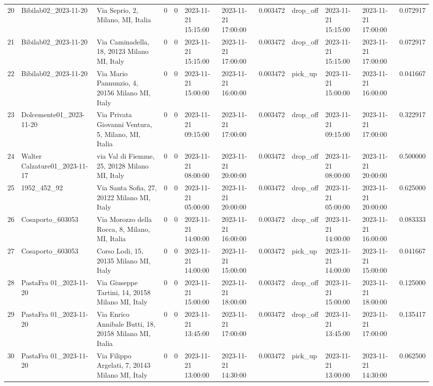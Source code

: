 \documentclass[titlepage]{article}
\begin{document}
\begin{table}[H]
\begin{adjustbox}{max width=\textwidth}
\begin{tabular}{rllrrllrlllr}
20 & Bibilab02\_2023-11-20 & Via Seprio, 2, Milano, MI, Italia & 0 & 0 & 2023-11-21 15:15:00 & 2023-11-21 17:00:00 & 0.003472 & drop\_off & 2023-11-21 15:15:00 & 2023-11-21 17:00:00 & 0.072917 \\
21 & Bibilab02\_2023-11-20 & Via Caminadella, 18, 20123 Milano MI, Italy & 0 & 0 & 2023-11-21 15:15:00 & 2023-11-21 17:00:00 & 0.003472 & drop\_off & 2023-11-21 15:15:00 & 2023-11-21 17:00:00 & 0.072917 \\
22 & Bibilab02\_2023-11-20 & Via Mario Pannunzio, 4, 20156 Milano MI, Italy & 0 & 0 & 2023-11-21 15:00:00 & 2023-11-21 16:00:00 & 0.003472 & pick\_up & 2023-11-21 15:00:00 & 2023-11-21 16:00:00 & 0.041667 \\
23 & Dolcemente01\_2023-11-20 & Via Privata Giovanni Ventura, 5, Milano, MI, Italia & 0 & 0 & 2023-11-21 09:15:00 & 2023-11-21 17:00:00 & 0.003472 & drop\_off & 2023-11-21 09:15:00 & 2023-11-21 17:00:00 & 0.322917 \\
24 & Walter Calzature01\_2023-11-17 & via Val di Fiemme, 25, 20128 Milano MI, Italy & 0 & 0 & 2023-11-21 08:00:00 & 2023-11-21 20:00:00 & 0.003472 & drop\_off & 2023-11-21 08:00:00 & 2023-11-21 20:00:00 & 0.500000 \\
25 & 1952\_452\_92 & Via Santa Sofia, 27, 20122 Milano MI, Italy & 0 & 0 & 2023-11-21 05:00:00 & 2023-11-21 20:00:00 & 0.003472 & drop\_off & 2023-11-21 05:00:00 & 2023-11-21 20:00:00 & 0.625000 \\
26 & Cosaporto\_603053 & Via Morozzo della Rocca, 8, Milano, MI, Italia & 0 & 0 & 2023-11-21 14:00:00 & 2023-11-21 16:00:00 & 0.003472 & drop\_off & 2023-11-21 14:00:00 & 2023-11-21 16:00:00 & 0.083333 \\
27 & Cosaporto\_603053 & Corso Lodi, 15, 20135 Milano MI, Italy & 0 & 0 & 2023-11-21 14:00:00 & 2023-11-21 15:00:00 & 0.003472 & pick\_up & 2023-11-21 14:00:00 & 2023-11-21 15:00:00 & 0.041667 \\
28 & PastaFra 01\_2023-11-20 & Via Giuseppe Tartini, 14, 20158 Milano MI, Italy & 0 & 0 & 2023-11-21 15:00:00 & 2023-11-21 18:00:00 & 0.003472 & drop\_off & 2023-11-21 15:00:00 & 2023-11-21 18:00:00 & 0.125000 \\
29 & PastaFra 01\_2023-11-20 & Via Enrico Annibale Butti, 18, 20158 Milano MI, Italia & 0 & 0 & 2023-11-21 13:45:00 & 2023-11-21 17:00:00 & 0.003472 & drop\_off & 2023-11-21 13:45:00 & 2023-11-21 17:00:00 & 0.135417 \\
30 & PastaFra 01\_2023-11-20 & Via Filippo Argelati, 7, 20143 Milano MI, Italy & 0 & 0 & 2023-11-21 13:00:00 & 2023-11-21 14:30:00 & 0.003472 & pick\_up & 2023-11-21 13:00:00 & 2023-11-21 14:30:00 & 0.062500 \\

\end{tabular}
\end{adjustbox}
\end{table}
\end{document}
